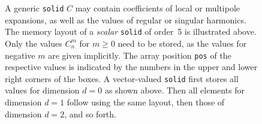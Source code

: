 \documentclass{scrbook}
\begin{document}
\begin{figure}
\centering
{}
\caption{\label{fig:solidmemorylayout}A generic \lstinline|solid| $C$ may
contain coefficients of local or multipole expansions, as well as the values of
regular or singular harmonics. The memory layout of a \emph{scalar}
\lstinline|solid| of order~5 is illustrated above. Only the values $C_n^m$ for
$m\geq 0$ need to be stored, as the values for negative $m$ are given
implicitly. The array position \lstinline|pos| of the respective values is
indicated by the numbers in the upper and lower right corners of the boxes. A
vector-valued \lstinline|solid| first stores all values for dimension $d=0$ as
shown above. Then all elements for dimension $d=1$ follow using the same
layout, then those of dimension $d=2$, and so forth.}
\end{figure}
\end{document}
